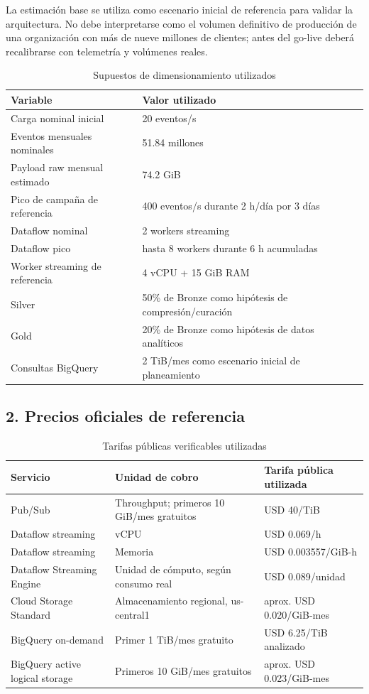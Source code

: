 \documentclass[11pt,a4paper]{article}
\begin{document}
La estimación base se utiliza como escenario inicial de referencia para validar la arquitectura. No debe interpretarse como el volumen definitivo de producción de una organización con más de nueve millones de clientes; antes del go-live deberá recalibrarse con telemetría y volúmenes reales.

\begin{table}[H]
\caption{Supuestos de dimensionamiento utilizados}\label{tab:supuestos-costos}
\small
\begin{tabularx}{\linewidth}{@{}P{.47\linewidth}Y@{}}\toprule
Variable & Valor utilizado\\\midrule
Carga nominal inicial & 20 eventos/s\\
Eventos mensuales nominales & 51.84 millones\\
Payload raw mensual estimado & 74.2 GiB\\
Pico de campaña de referencia & 400 eventos/s durante 2 h/día por 3 días\\
Dataflow nominal & 2 workers streaming\\
Dataflow pico & hasta 8 workers durante 6 h acumuladas\\
Worker streaming de referencia & 4 vCPU + 15 GiB RAM\\
Silver & 50\% de Bronze como hipótesis de compresión/curación\\
Gold & 20\% de Bronze como hipótesis de datos analíticos\\
Consultas BigQuery & 2 TiB/mes como escenario inicial de planeamiento\\\bottomrule
\end{tabularx}
\end{table}

\subsection*{2. Precios oficiales de referencia}

\begin{table}[H]
\caption{Tarifas públicas verificables utilizadas}\label{tab:precios-gcp}
\small
\begin{tabularx}{\linewidth}{@{}P{.27\linewidth}P{.39\linewidth}Y@{}}\toprule
Servicio & Unidad de cobro & Tarifa pública utilizada\\\midrule
Pub/Sub & Throughput; primeros 10 GiB/mes gratuitos & USD 40/TiB\\
Dataflow streaming & vCPU & USD 0.069/h\\
Dataflow streaming & Memoria & USD 0.003557/GiB-h\\
Dataflow Streaming Engine & Unidad de cómputo, según consumo real & USD 0.089/unidad\\
Cloud Storage Standard & Almacenamiento regional, us-central1 & aprox. USD 0.020/GiB-mes\\
BigQuery on-demand & Primer 1 TiB/mes gratuito & USD 6.25/TiB analizado\\
BigQuery active logical storage & Primeros 10 GiB/mes gratuitos & aprox. USD 0.023/GiB-mes\\\bottomrule
\end{tabularx}
\end{table}
\end{document}
